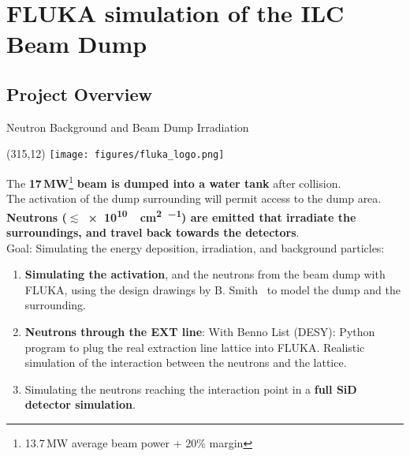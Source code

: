 \documentclass[xcolor={dvipsnames}]{beamer}
\newcommand{\flukalogo}{
  \setlength{\TPHorizModule}{1pt}
  \setlength{\TPVertModule}{1pt}
  \begin{textblock}{1}(315,12)
   \texttt{[image: figures/fluka\_logo.png]}
  \end{textblock}
}
\begin{document}

\section{FLUKA simulation of the ILC Beam Dump}

\subsection{Project Overview}
{
\begin{frame}{Neutron Background and Beam Dump Irradiation}
\flukalogo
The \textbf{17\,MW}\footnote{13.7\,MW average beam power + 20\% margin} \textbf{beam is dumped into a water tank} after collision.\\The activation of the dump surrounding will permit access to the dump area. \textbf{Neutrons ($\lesssim$\SI{e10}{\per\square\centi\metre\per\year}) are emitted that irradiate the surroundings, and travel back towards the detectors}.~\cite{SLAC_FLUKA}\\
\vspace*{0.1cm}
\alert{Goal: Simulating the energy deposition, irradiation, and background particles:}
\begin{enumerate}
 \item \textbf{Simulating the activation}, and the neutrons from the beam dump with FLUKA, using the design drawings by B. Smith~\cite{Smith} to model the dump and the surrounding.
 \item \textbf{Neutrons through the EXT line}: With Benno List (DESY): Python program to plug the real extraction line lattice into FLUKA. Realistic simulation of the interaction between the neutrons and the lattice.
 \item Simulating the neutrons reaching the interaction point in a \textbf{full SiD detector simulation}.
\end{enumerate}
\end{frame}
}
\end{document}
